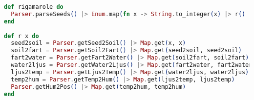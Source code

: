 \begin{lstlisting}[language=Elixir, caption=Printing the entire rigamarole]
def rigamarole do
  Parser.parseSeeds() |> Enum.map(fn x -> String.to_integer(x) |> r() |> IO.inspect() end)
end
  
def r x do
  seed2soil = Parser.getSeed2Soil() |> Map.get(x, x)
  soil2fart = Parser.getSoil2Fart() |> Map.get(seed2soil, seed2soil)
  fart2water = Parser.getFart2Water() |> Map.get(soil2fart, soil2fart)
  water2ljus = Parser.getWater2Ljus() |> Map.get(fart2water, fart2water)
  ljus2temp = Parser.getLjus2Temp() |> Map.get(water2ljus, water2ljus)
  temp2hum = Parser.getTemp2Hum() |> Map.get(ljus2temp, ljus2temp)
  Parser.getHum2Pos() |> Map.get(temp2hum, temp2hum)
end
\end{lstlisting}